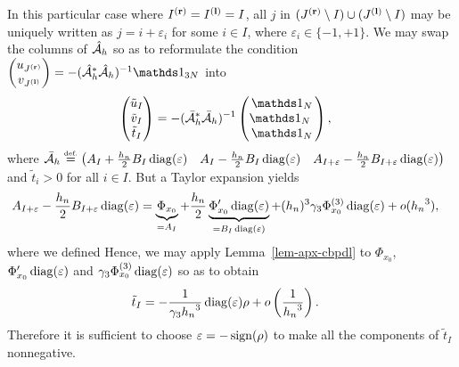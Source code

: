 In this particular case where ${I^{\mathbf{(r)}}}= {I^{\mathbf{(l)}}}= I$, all $j$ in $({J^{\mathbf{(r)}}}\setminus I)\cup ({J^{\mathbf{(l)}}}\setminus I)$ may be uniquely written as $j=i+\varepsilon_i$ for some $i\in I$, where $\varepsilon_i\in\{-1,+1\}$.
We may swap the columns of ${\hat{\mathcal{A}}_h}$ so as to reformulate the condition  $\begin{pmatrix} u_{\Jup}\\v_{\Jdown} \end{pmatrix}=-(\Copt^*\Copt)^{-1}\bun_{3N}$ into
\begin{align*}  
  \begin{pmatrix} \tilde{u}_I\\ \tilde{v}_I\\ \tilde{t}_I  \end{pmatrix}&=-(\Capt^*\Capt)^{-1}\begin{pmatrix}
    \bun_N\\\bun_N\ \\\bun_N 
  \end{pmatrix},
\end{align*}
where ${\bar{\mathcal{A}}_h} \stackrel{\mbox{\upshape\tiny def.}}{=} \begin{pmatrix} {A}_I+ \frac{{h_n}}{2}{B}_I\operatorname{diag}(\varepsilon)  & {A}_I-\frac{{h_n}}{2}{B}_I\operatorname{diag}(\varepsilon) & {A}_{I+\varepsilon}-\frac{{h_n}}{2}{B}_{I+\varepsilon}\operatorname{diag}(\varepsilon)\end{pmatrix}$
and $\tilde{t}_i>0$ for all $i\in I$.
But a Taylor expansion yields
\begin{align*}
  {A}_{I+\varepsilon}-\frac{{h_n}}{2}{B}_{I+\varepsilon}\operatorname{diag}(\varepsilon)&= \underbrace{\Phi_{x_0}}_{={A}_I}+ \frac{{h_n}}{2}\underbrace{\Phi_{x_0}'\operatorname{diag}(\varepsilon)}_{={B}_I\operatorname{diag}(\varepsilon)}+ ({h_n})^3 \gamma_3\Phi^{(3)}_{x_0}\operatorname{diag}(\varepsilon)+o({h_n}^3),
\end{align*}
where we defined
Hence, we may apply Lemma~\ref{lem-apx-cbpdl} to $\Phi_{x_0}$, $\Phi_{x_0}'\operatorname{diag}(\varepsilon)$ and $\gamma_3\Phi^{(3)}_{x_0}\operatorname{diag}(\varepsilon)$ so as to obtain
\begin{align*}
  \tilde{t}_I &=  -\frac{1}{\gamma_3{h_n}^3}\operatorname{diag}(\varepsilon) \rho +o\left(\frac{1}{{h_n}^3}\right).
\end{align*}
Therefore it is sufficient to choose $\varepsilon = -\operatorname{sign}(\rho)$ to make all the components of $\tilde{t}_I$ nonnegative.


